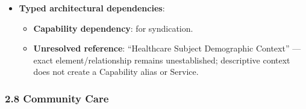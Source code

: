 \begin{itemize}
\begin{itemize}
\begin{itemize}
\item
\emph{Exposed Service}: \texttt{} — Discloses screening due dates to primary care providers.



\end{itemize}


\end{itemize}


\item
\textbf{Typed architectural dependencies}:


\begin{itemize}

\item
\textbf{Capability dependency}: \texttt{} for syndication.



\item
\textbf{Unresolved reference}: “Healthcare Subject Demographic Context” — exact element/\allowbreak{}relationship remains unestablished; descriptive context does not create a Capability alias or Service.



\end{itemize}


\end{itemize}
\label{rad:sd:178}

\par\smallskip
{}\label{rad:sd:180}



\label{rad:sd:182}
\subsubsection*{2.8 Community Care}
\label{rad:sd:183}

